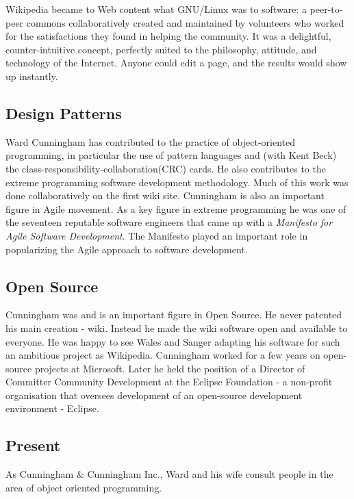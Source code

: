 \documentclass[11pt]{article}
\begin{document}
Wikipedia became to Web content what GNU/Linux was to software: a peer-to-peer commons collaboratively created and maintained by volunteers who worked for the satisfactions they found in helping the community. It was a delightful, counter-intuitive concept, perfectly suited to the philosophy, attitude, and technology of the Internet. Anyone could edit a page, and the results would show up instantly.\cite{innovators}

\subsection{Design Patterns}
Ward Cunningham has contributed to the practice of object-oriented programming, in particular the use of pattern languages and (with Kent Beck) the class-responsibility-collaboration(CRC) cards. He also contributes to the extreme programming software development methodology. Much of this work was done collaboratively on the first wiki site. Cunningham is also an important figure in Agile movement. As a key figure in extreme programming he was one of the seventeen reputable software engineers that came up with a \textit{Manifesto for Agile Software Development}. The Manifesto played an important role in popularizing the Agile approach to software development. \cite{agile-manifesto}\cite{wiki-cunningham}
\subsection{Open Source}
\par
Cunningham was and is an important figure in Open Source. He never patented his main creation - wiki. Instead he made the wiki software open and available to everyone. He was happy to see  Wales and Sanger adapting his software for such an ambitious project as Wikipedia.\cite{innovators}
Cunningham worked for a few years on open-source projects at Microsoft. Later he held the position of a Director of Committer Community Development at the Eclipse Foundation - a non-profit organisation that oversees development of an open-source development environment - Eclipse.
\subsection{Present}
As Cunningham  \& Cunningham  Inc., Ward and  his  wife consult people in the area of object oriented programming.

\end{document}
